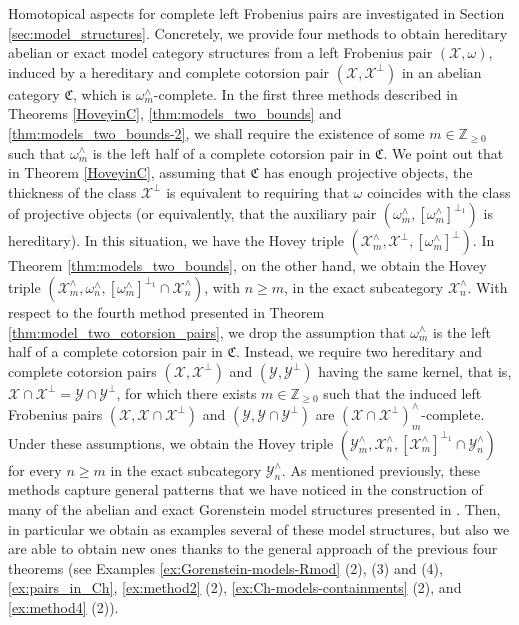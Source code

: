 \documentclass[10pt,reqno]{amsart}
\numberwithin{equation}{section}
\theoremstyle{remark}
\newcommand{\C}{\mathfrak{C}}
\newcommand{\X}{\mathcal{X}}
\newcommand{\Y}{\mathcal{Y}}
\begin{document}
Homotopical aspects for complete left Frobenius pairs are investigated in Section \ref{sec:model_structures}. Concretely, we provide four methods to obtain hereditary abelian or exact model category structures from a left Frobenius pair $(\X,\omega)$, induced by a hereditary and complete cotorsion pair $(\X,\X^\perp)$ in an abelian category $\C$, which is $\omega^\wedge_m$-complete. In the first three methods described in Theorems \ref{HoveyinC}, \ref{thm:models_two_bounds} and \ref{thm:models_two_bounds-2}, we shall require the existence of some $m \in \mathbb{Z}_{\geq 0}$ such that $\omega^\wedge_m$ is the left half of a complete cotorsion pair in $\C$. We point out that in Theorem \ref{HoveyinC}, assuming that $\C$ has enough projective objects, the thickness of the class $\X^\perp$ is equivalent to requiring that $\omega$ coincides with the class of projective objects (or equivalently, that the auxiliary pair $(\omega^\wedge_m,[\omega^\wedge_m]^{\perp_1})$ is hereditary). In this situation, we have the Hovey triple $(\X^\wedge_m, \X^\perp, [\omega^\wedge_m]^\perp)$. In Theorem \ref{thm:models_two_bounds}, on the other hand, we obtain the Hovey triple $(\X^\wedge_m, \omega^\wedge_n, [\omega^\wedge_m]^{\perp_1} \cap \X^\wedge_n)$, with $n \geq m$, in the exact subcategory $\mathcal{X}^\wedge_n$. With respect to the fourth method presented in Theorem \ref{thm:model_two_cotorsion_pairs}, we drop the assumption that $\omega^\wedge_m$ is the left half of a complete cotorsion pair in $\C$. Instead, we require two hereditary and complete cotorsion pairs $(\X,\X^\perp)$ and $(\Y,\Y^\perp)$ having the same kernel, that is, $\X \cap \X^\perp = \Y \cap \Y^\perp$, for which there exists $m \in \mathbb{Z}_{\geq 0}$ such that the induced left Frobenius pairs $(\X,\X \cap \X^\perp)$ and $(\Y, \Y \cap \Y^\perp)$ are $(\X \cap \X^\perp)^\wedge_m$-complete. Under these assumptions, we obtain the Hovey triple $
(\mathcal{Y}^\wedge_m, \mathcal{X}^\wedge_n, [\mathcal{X}^\wedge_m]^{\perp_1} \cap \mathcal{Y}^\wedge_n)$ for every $n \geq m$ in the exact subcategory $\mathcal{Y}^\wedge_n$. As mentioned previously, these methods capture general patterns that we have noticed in the construction of many of the abelian and exact Gorenstein model structures presented in \cite{Rachid,Chains,WeiWangLiu-DingModels}. Then, in particular we obtain as examples several of these model structures, but also we are able to obtain new ones thanks to the general approach of the previous four theorems (see Examples \ref{ex:Gorenstein-models-Rmod} (2), (3) and (4), \ref{ex:pairs_in_Ch}, \ref{ex:method2} (2), \ref{ex:Ch-models-containments} (2), and \ref{ex:method4} (2)). 
\end{document}
